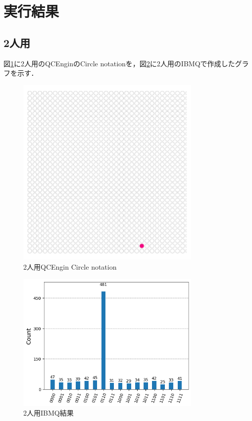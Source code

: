 \documentclass[titlepage,a4paper]{jsarticle}
\begin{document}
\section{実行結果}
\subsection{2人用}
図\ref{2:circle}に2人用のQCEnginのCircle notationを，図\ref{2:ibmq}に2人用のIBMQで作成したグラフを示す．
\begin{figure}[H]
  \centering
  \includegraphics[width=0.8\textwidth]{img/2_circle.png}
  \caption{2人用QCEngin Circle notation}
  \label{2:circle}
\end{figure}
\begin{figure}[H]
  \centering
  \includegraphics[width=0.8\textwidth]{img/2_kairyou_python.png}
  \caption{2人用IBMQ結果}
  \label{2:ibmq}
\end{figure}
\end{document}
